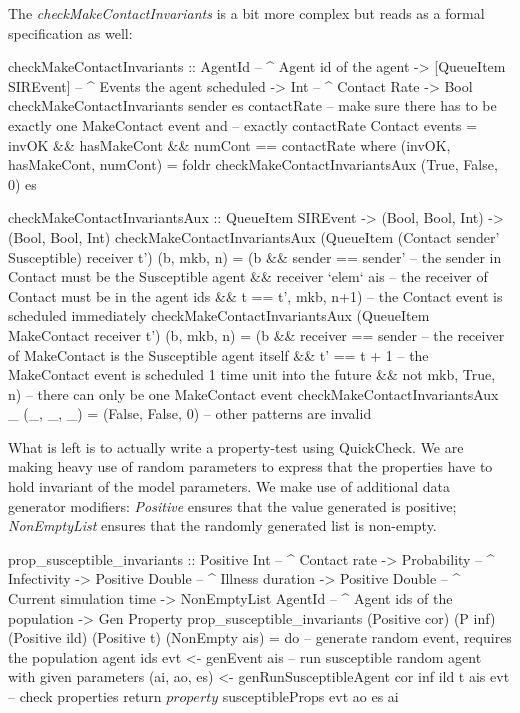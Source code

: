 The \textit{checkMakeContactInvariants} is a bit more complex but reads as a formal specification as well:

\begin{HaskellCode}
checkMakeContactInvariants :: AgentId              -- ^ Agent id of the agent 
                           -> [QueueItem SIREvent] -- ^ Events the agent scheduled
                           -> Int                  -- ^ Contact Rate
                           -> Bool
checkMakeContactInvariants sender es contactRate
    -- make sure there has to be exactly one MakeContact event and
    -- exactly contactRate Contact events
    = invOK && hasMakeCont && numCont == contactRate
  where
    (invOK, hasMakeCont, numCont) 
      = foldr checkMakeContactInvariantsAux (True, False, 0) es

    checkMakeContactInvariantsAux :: QueueItem SIREvent 
                                  -> (Bool, Bool, Int)
                                  -> (Bool, Bool, Int)
    checkMakeContactInvariantsAux 
        (QueueItem (Contact sender' Susceptible) receiver t') (b, mkb, n)
      = (b && sender == sender'    -- the sender in Contact must be the Susceptible agent
           && receiver `elem` ais  -- the receiver of Contact must be in the agent ids
           && t == t', mkb, n+1)   -- the Contact event is scheduled immediately
    checkMakeContactInvariantsAux 
        (QueueItem MakeContact receiver t') (b, mkb, n) 
      = (b && receiver == sender   -- the receiver of MakeContact is the Susceptible agent itself
           && t' == t + 1          -- the MakeContact event is scheduled 1 time unit into the future
           &&  not mkb, True, n)   -- there can only be one MakeContact event
    checkMakeContactInvariantsAux _ (_, _, _) 
      = (False, False, 0)          -- other patterns are invalid
\end{HaskellCode}

What is left is to actually write a property-test using QuickCheck. We are making heavy use of random parameters to express that the properties have to hold invariant of the model parameters. We make use of additional data generator modifiers: \textit{Positive} ensures that the value generated is positive; \textit{NonEmptyList} ensures that the randomly generated list is non-empty.

\begin{HaskellCode}
prop_susceptible_invariants :: Positive Int         -- ^ Contact rate
                            -> Probability          -- ^ Infectivity
                            -> Positive Double      -- ^ Illness duration
                            -> Positive Double      -- ^ Current simulation time
                            -> NonEmptyList AgentId -- ^ Agent ids of the population
                            -> Gen Property
prop_susceptible_invariants 
  (Positive cor) (P inf) (Positive ild) (Positive t) (NonEmpty ais) = do
  -- generate random event, requires the population agent ids
  evt <- genEvent ais
  -- run susceptible random agent with given parameters
  (ai, ao, es) <- genRunSusceptibleAgent cor inf ild t ais evt
  -- check properties
  return $ property $ susceptibleProps evt ao es ai
\end{HaskellCode}

